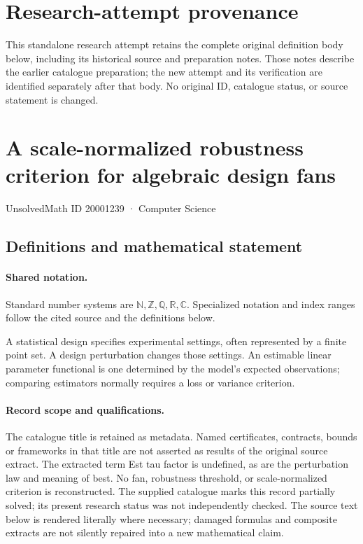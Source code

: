 \documentclass[11pt]{article}
\begin{document}
\section*{Research-attempt provenance}
This standalone research attempt retains the complete original definition body below,
including its historical source and preparation notes. Those notes describe the
earlier catalogue preparation; the new attempt and its verification are identified
separately after that body. No original ID, catalogue status, or source statement is changed.

\section{A scale-normalized robustness criterion for algebraic design fans}\label{20001239}
{\small UnsolvedMath ID 20001239 · Computer Science}
\subsection{Definitions and mathematical statement}

\paragraph{Shared notation.}Standard number systems are $\mathbb N,\mathbb Z,\mathbb Q,\mathbb R,\mathbb C$. Specialized notation and index ranges follow the cited source and the definitions below.


A statistical design specifies experimental settings, often represented by a finite point set. A design perturbation changes those settings. An estimable linear parameter functional is one determined by the model's expected observations; comparing estimators normally requires a loss or variance criterion.
\paragraph{Record scope and qualifications.}
The catalogue title is retained as metadata. Named certificates, contracts, bounds or frameworks in that title are not asserted as results of the original source extract.
The extracted term Est tau factor is undefined, as are the perturbation law and meaning of best. No fan, robustness threshold, or scale-normalized criterion is reconstructed. The supplied catalogue marks this record partially solved; its present research status was not independently checked.
The source text below is rendered literally where necessary; damaged formulas and composite extracts are not silently repaired into a new mathematical claim.
\end{document}
